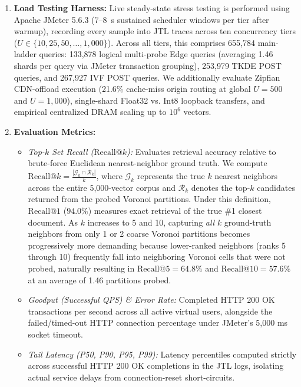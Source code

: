 \documentclass[11pt,journal,compsoc,onecolumn]{IEEEtran}
\begin{document}
\begin{enumerate}
    \item \textbf{Load Testing Harness:} Live steady-state stress testing is performed using Apache JMeter 5.6.3 (7--8~s sustained scheduler windows per tier after warmup), recording every sample into JTL traces across ten concurrency tiers ($U \in \{10, 25, 50, \dots, 1{,}000\}$). Across all tiers, this comprises 655,784 main-ladder queries: 133,878 logical multi-probe Edge queries (averaging 1.46 shards per query via JMeter transaction grouping), 253,979 TKDE POST queries, and 267,927 IVF POST queries. We additionally evaluate Zipfian CDN-offload execution (21.6\% cache-miss origin routing at global $U=500$ and $U=1,000$), single-shard Float32 vs. $\text{Int8}$ loopback transfers, and empirical centralized DRAM scaling up to $10^6$ vectors.
    \item \textbf{Evaluation Metrics:}
    \begin{itemize}
        \item \textit{Top-$k$ Set Recall ($\text{Recall}@k$):} Evaluates retrieval accuracy relative to brute-force Euclidean nearest-neighbor ground truth. We compute $\text{Recall}@k = \frac{|\mathcal{G}_k \cap \mathcal{R}_k|}{k}$, where $\mathcal{G}_k$ represents the true $k$ nearest neighbors across the entire 5,000-vector corpus and $\mathcal{R}_k$ denotes the top-$k$ candidates returned from the probed Voronoi partitions. Under this definition, $\text{Recall}@1$ ($94.0\%$) measures exact retrieval of the true \#1 closest document. As $k$ increases to 5 and 10, capturing \textit{all} $k$ ground-truth neighbors from only 1 or 2 coarse Voronoi partitions becomes progressively more demanding because lower-ranked neighbors (ranks 5 through 10) frequently fall into neighboring Voronoi cells that were not probed, naturally resulting in $\text{Recall}@5 = 64.8\%$ and $\text{Recall}@10 = 57.6\%$ at an average of 1.46 partitions probed.
        \item \textit{Goodput (Successful QPS) \& Error Rate:} Completed HTTP 200 OK transactions per second across all active virtual users, alongside the failed/timed-out HTTP connection percentage under JMeter's 5,000 ms socket timeout.
        \item \textit{Tail Latency (P50, P90, P95, P99):} Latency percentiles computed strictly across successful HTTP 200 OK completions in the JTL logs, isolating actual service delays from connection-reset short-circuits.
    \end{itemize}
\end{enumerate}
\end{document}
